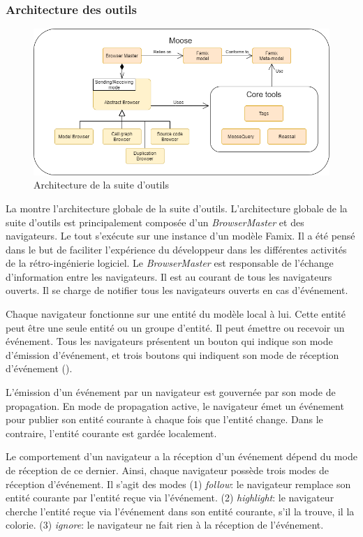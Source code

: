 \documentclass[a4paper]{article}
\newcommand{\browserMaster}{\textit{BrowserMaster} \xspace}
\begin{document}
\subsubsection{Architecture des outils }
\begin{figure}[htbp]
  \begin{center}
  \includegraphics[width=0.8\linewidth]{./figures/architecture.png}
  \caption{Architecture de la suite d'outils}
  \label{fig:applicationArchitecture}
  \end{center}
  \vspace{-0.3cm}
\end{figure}

La  montre l'architecture globale de la suite d'outils.
L'architecture globale de la suite d'outils est principalement composée d'un \browserMaster et des navigateurs.
Le tout s'exécute sur une instance d'un modèle Famix. 
Il a été pensé dans le but de faciliter l'expérience du développeur dans les différentes activités de la rétro-ingénierie logiciel.
Le \browserMaster est responsable de l'échange d'information entre les navigateurs.
Il est au courant de tous les navigateurs ouverts. 
Il se charge de notifier tous les navigateurs ouverts en cas d'événement.

Chaque navigateur fonctionne sur une entité du modèle  local à lui.
Cette entité peut être une seule entité ou un groupe d'entité.
Il peut émettre ou recevoir un événement.
Tous les navigateurs présentent un bouton qui indique son mode d'émission d'événement, et trois boutons qui indiquent son mode de réception d'événement (\eg {}).

L'émission d'un événement par un navigateur est gouvernée par son mode de propagation.
En mode de propagation active, le navigateur émet un événement pour publier son entité courante à chaque fois que l'entité change.
Dans le contraire, l'entité courante est gardée localement.

Le comportement d'un navigateur a la réception d'un événement dépend du mode de réception de ce dernier.
Ainsi, chaque navigateur possède trois modes de réception d'événement.  
Il s'agit des modes (1) \textit{follow}: le navigateur  remplace son entité courante par l'entité reçue via l'événement.
(2) \textit{highlight}: le navigateur cherche l'entité reçue via l'événement dans son entité courante, s'il la trouve, il la colorie.
(3) \textit{ignore}: le navigateur ne fait rien à la réception de l'événement.
\end{document}
